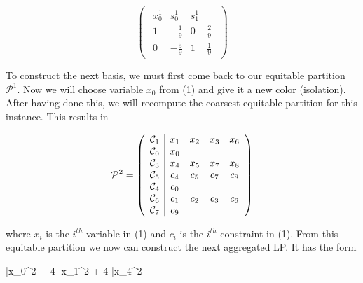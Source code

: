 \documentclass[11pt]{article} %
\newcommand{\cC}{{\cal C}}
\begin{document}
	\begin{equation}
	\begin{pmatrix}
	\begin{array}{ccc|c}
		\bar{x}_0^1 & \bar{s}_0^1 & \bar{s}_1^1 \\
		\hline
		1 & -\frac{1}{9} & 0 & \frac{2}{9} \\
		0 & -\frac{5}{9} & 1 & \frac{1}{9} 
	\end{array}
	\end{pmatrix}
	\end{equation}
	
	  To construct the next basis, we must first come back to our equitable partition $\mathcal{P}^1$.  Now we will choose variable $x_0$ from (1) and give it a new color (isolation).  After having done this, we will recompute the coarsest equitable partition for this instance.  This results in
	
	\begin{equation}
	\mathcal{P}^2 = 
	\begin{pmatrix}
	\begin{array}{c|cccc}
	\cC_1 & x_1 & x_2 & x_3 & x_6 \\
	\cC_0 & x_0 &&& \\
	\cC_3 & x_4 & x_5 & x_7 & x_8 \\
	\cC_5 & c_4 & c_5 & c_7 & c_8 \\
	\cC_4 & c_0 &&& \\
	\cC_6 & c_1 & c_2 & c_3 & c_6 \\
	\cC_7 & c_9 &&&
 	\end{array}
	\end{pmatrix}
	\end{equation}
	
	where $x_i$ is the $i^{th}$ variable in (1) and $c_i$ is the $i^{th}$ constraint in (1). From this equitable partition we now can construct the next aggregated LP.  It has the form
	
	\begin{mini!}
		{}{\bar{x}_0^2 + 4 \bar{x}_1^2 + 4 \bar{x}_4^2}{}{}
	\end{mini!}
\end{document}

